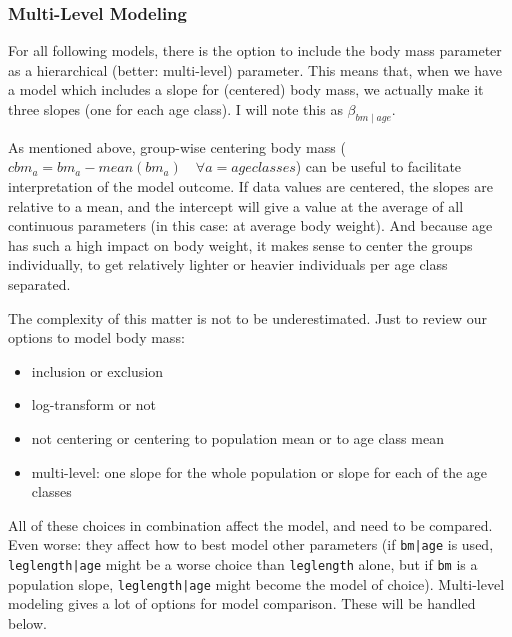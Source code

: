 \FloatBarrier
\subsubsection{Multi-Level Modeling}
\label{sec:org25b6e1a}
For all following models, there is the option to include the body mass parameter as a hierarchical (better: multi-level) parameter.
This means that, when we have a model which includes a slope for (centered) body mass, we actually make it three slopes (one for each age class). I will note this as \(\beta_{bm\mid age}\).

As mentioned above, group-wise centering body mass (\(cbm_a = bm_a - mean(bm_a)\quad \forall a = {ageclasses}\)) can be useful to facilitate interpretation of the model outcome.
If data values are centered, the slopes are relative to a mean, and the intercept will give a value at the average of all continuous parameters (in this case: at average body weight).
And because age has such a high impact on body weight, it makes sense to center the groups individually, to get relatively lighter or heavier individuals per age class separated.

The complexity of this matter is not to be underestimated.
Just to review our options to model body mass:
\begin{itemize}
\item inclusion or exclusion
\item log-transform or not
\item not centering or centering to population mean or to age class mean
\item multi-level: one slope for the whole population or slope for each of the age classes
\end{itemize}

All of these choices in combination affect the model, and need to be compared.
Even worse: they affect how to best model other parameters (if \texttt{bm|age} is used, \texttt{leglength|age} might be a worse choice than \texttt{leglength} alone, but if \texttt{bm} is a population slope, \texttt{leglength|age} might become the model of choice).
Multi-level modeling gives a lot of options for model comparison.
These will be handled below.


